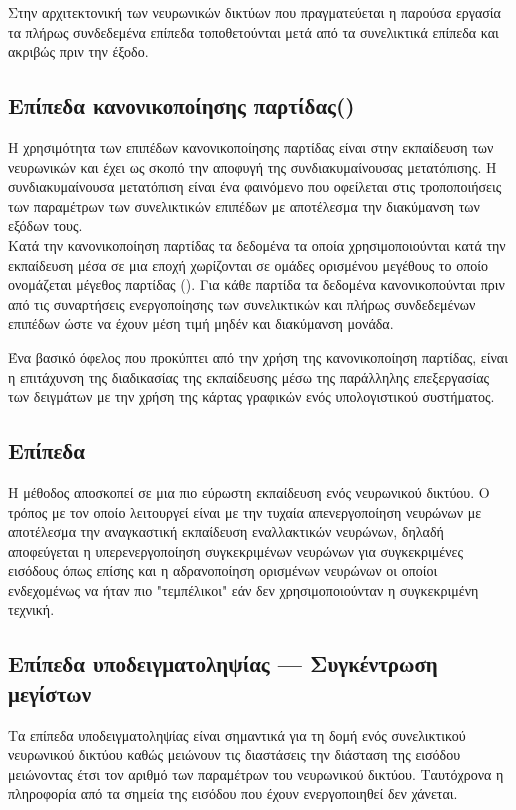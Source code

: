 Στην αρχιτεκτονική των νευρωνικών δικτύων που πραγματεύεται η παρούσα εργασία τα πλήρως συνδεδεμένα επίπεδα τοποθετούνται μετά από τα συνελικτικά επίπεδα και ακριβώς πριν την έξοδο.

\subsection{Επίπεδα κανονικοποίησης παρτίδας()}
Η χρησιμότητα των επιπέδων κανονικοποίησης παρτίδας είναι στην εκπαίδευση των νευρωνικών και έχει ως σκοπό την αποφυγή της συνδιακυμαίνουσας μετατόπισης. Η συνδιακυμαίνουσα μετατόπιση είναι ένα φαινόμενο που οφείλεται στις τροποποιήσεις των παραμέτρων των συνελικτικών επιπέδων με αποτέλεσμα την διακύμανση των εξόδων τους.\\

Κατά την κανονικοποίηση παρτίδας τα δεδομένα τα οποία χρησιμοποιούνται κατά την εκπαίδευση μέσα σε μια εποχή χωρίζονται σε ομάδες ορισμένου μεγέθους το οποίο ονομάζεται μέγεθος παρτίδας (). Για κάθε παρτίδα τα δεδομένα κανονικοπούνται πριν από τις συναρτήσεις ενεργοποίησης των συνελικτικών και πλήρως συνδεδεμένων επιπέδων ώστε να έχουν μέση τιμή μηδέν και διακύμανση μονάδα.

Ένα βασικό όφελος που προκύπτει από την χρήση της κανονικοποίηση παρτίδας, είναι η επιτάχυνση της διαδικασίας της εκπαίδευσης μέσω της παράλληλης επεξεργασίας των δειγμάτων με την χρήση της κάρτας γραφικών ενός υπολογιστικού συστήματος.

\subsection{Επίπεδα }
Η μέθοδος  αποσκοπεί σε μια πιο εύρωστη εκπαίδευση ενός νευρωνικού δικτύου. Ο τρόπος με τον οποίο λειτουργεί είναι με την τυχαία απενεργοποίηση νευρώνων με αποτέλεσμα την αναγκαστική εκπαίδευση εναλλακτικών νευρώνων, δηλαδή αποφεύγεται η υπερενεργοποίηση συγκεκριμένων νευρώνων για συγκεκριμένες εισόδους όπως επίσης και η αδρανοποίηση ορισμένων νευρώνων οι οποίοι ενδεχομένως να ήταν πιο "τεμπέλικοι" εάν δεν χρησιμοποιούνταν η συγκεκριμένη τεχνική.

\subsection{Επίπεδα υποδειγματοληψίας --- Συγκέντρωση μεγίστων }
Τα επίπεδα υποδειγματοληψίας είναι σημαντικά για τη δομή ενός συνελικτικού νευρωνικού δικτύου καθώς μειώνουν τις διαστάσεις την διάσταση της εισόδου μειώνοντας έτσι τον αριθμό των παραμέτρων του νευρωνικού δικτύου. Ταυτόχρονα η πληροφορία από τα σημεία της εισόδου που έχουν ενεργοποιηθεί δεν χάνεται. 


